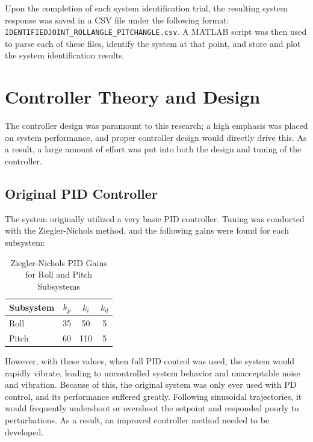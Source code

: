 Upon the completion of each system identification trial, the resulting system response was saved in a CSV file under the following format: \texttt{IDENTIFIEDJOINT\_ROLLANGLE\_PITCHANGLE.csv}. A MATLAB script was then used to parse each of these files, identify the system at that point, and store and plot the system identification results.

\section{Controller Theory and Design}
The controller design was paramount to this research; a high emphasis was placed on system performance, and proper controller design would directly drive this. As a result, a large amount of effort was put into both the design and tuning of the controller.

\subsection{Original PID Controller}

The system originally utilized a very basic PID controller. Tuning was conducted with the Ziegler-Nichols method, and the following gains were found for each subsystem:

\begin{table}[htbp]
    \centering
    \caption{Ziegler-Nichols PID Gains for Roll and Pitch Subsystems}
    \label{tab:pid_gains}
    \begin{tabular}{l c c c}
        \toprule
        \textbf{Subsystem} & \textbf{$k_p$} & \textbf{$k_i$} & \textbf{$k_d$} \\
        \midrule
        Roll               & 35             & 50             & 5              \\
        Pitch              & 60             & 110            & 5              \\
        \bottomrule
    \end{tabular}
\end{table}

However, with these values, when full PID control was used, the system would rapidly vibrate, leading to uncontrolled system behavior and unacceptable noise and vibration. Because of this, the original system was only ever used with PD control, and its performance suffered greatly. Following sinusoidal trajectories, it would frequently undershoot or overshoot the setpoint and responded poorly to perturbations. As a result, an improved controller method needed to be developed.


